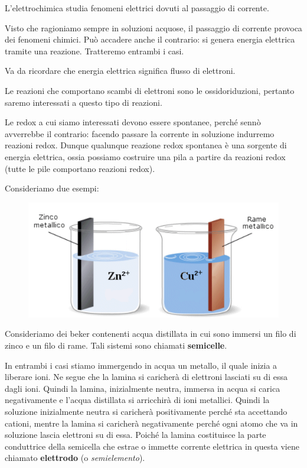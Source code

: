 L'elettrochimica studia fenomeni elettrici dovuti al passaggio di corrente.

Visto che ragioniamo sempre in soluzioni acquose, il passaggio di corrente provoca dei fenomeni chimici. Può accadere anche il contrario: si genera energia elettrica tramite una reazione. Tratteremo entrambi i casi.

\vspace{0.2cm}Va da ricordare che energia elettrica significa flusso di elettroni.

Le reazioni che comportano scambi di elettroni sono le ossidoriduzioni, pertanto saremo interessati a questo tipo di reazioni.

Le redox a cui siamo interessati devono essere spontanee, perché sennò avverrebbe il contrario: facendo passare la corrente in soluzione indurremo reazioni redox. Dunque qualunque reazione redox spontanea è una sorgente di energia elettrica, ossia possiamo costruire una pila a partire da reazioni redox (tutte le pile comportano reazioni redox).

Consideriamo due esempi:

\begin{figure}[H]
    \centering
    \includegraphics[width=12cm]{immagini/piastre_metalliche.png}
\end{figure}

Consideriamo dei beker contenenti acqua distillata in cui sono immersi un filo di zinco e un filo di rame. Tali sistemi sono chiamati \textbf{semicelle}.

In entrambi i casi stiamo immergendo in acqua un metallo, il quale inizia a liberare ioni. Ne segue che la lamina si caricherà di elettroni lasciati su di essa dagli ioni. Quindi la lamina, inizialmente neutra, immersa in acqua si carica negativamente e l'acqua distillata si arricchirà di ioni metallici. Quindi la soluzione inizialmente neutra si caricherà positivamente perché sta accettando cationi, mentre la lamina si caricherà negativamente perché ogni atomo che va in soluzione lascia elettroni su di essa. Poiché la lamina costituisce la parte conduttrice della semicella che estrae o immette corrente elettrica in questa viene chiamato \textbf{elettrodo} (o \textit{semielemento}).

